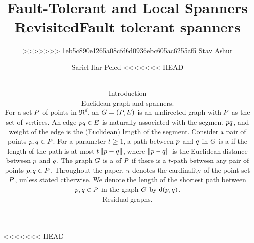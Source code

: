 \documentclass[12pt]{article}%
\begin{document}
	
<<<<<<< HEAD
\title{Fault-Tolerant and Local Spanners Revisited} \author{%
=======
\title{Fault tolerant spanners}
\author{%
>>>>>>> 1eb5c890e1265a08cfd6d0936ebc605ac6255af5
   Stav Ashur%
   \StavThanks{}%
   \and%
   Sariel Har-Peled%
<<<<<<< HEAD
}%
	
\maketitle

\renewcommand{\G}{\Mh{G}}%
\newcommand{\PS}{\Mh{P}}%
\newcommand{\EG}{\Mh{E}}%
\newcommand{\EGX}[1]{\Mh{E}\pth{#1}}%
\newcommand{\region}{\Mh{\mathcalb{r}}}%
\newcommand{\gminus}{-}%
\newcommand{\interiorX}[1]{\mathrm{int}\pth{#1}}%
\newcommand{\restrictY}[2]{#1 \cap {#2}}

\section{Introduction}

\paragraph{Euclidean graph and spanners.}
For a set $\PS$ of points in $\Re^d$, an 
$\G = (\PS, \EG)$ is an undirected graph with $\PS$ as the set of
vertices. An edge $\pa \pb \in \EG$ is naturally associated with the
segment $pq$, and weight of the edge is the (Euclidean) length of
the segment.  Consider a pair of points $\pa,\pb \in \PS$. For a
parameter $t \geq 1$, a path between $p$ and $q$ in $\G$ is a
 if the length of the path is at most
$t \left\| p - q \right\|$, where $\left\| p - q \right\|$ is the Euclidean distance
between $p$ and $q$.  The graph $\G$ is a  of
$\PS$ if there is a $t$-path between any pair of points
$\pa,\pb\in \PS$.  Throughout the paper, $n$ denotes the cardinality
of the point set $\PS$, unless stated otherwise. We denote the length
of the shortest path between $\pa,\pb\in \PS$ in the graph $\G$ by
$\dGY{\pa}{\pb}$.

\paragraph{Residual graphs.}

}
\end{document}
